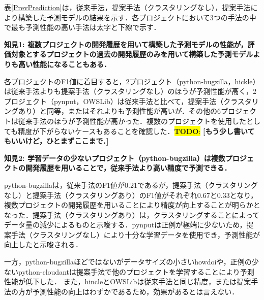 \documentclass[T,J]{fose} %
\newcommand{\todo}[1]{\colorbox{yellow}{{\bf TODO}:}{\color{red} {\textbf{[#1]}}}}
\begin{document}
表\ref{PrevPrediction}は，従来手法，提案手法（クラスタリングなし），提案手法により構築した予測モデルの結果を示す．各プロジェクトにおいて3つの手法の中で最も予測性能の高い手法は太字と下線で示す．

\noindent\textbf{知見1: 複数プロジェクトの開発履歴を用いて構築した予測モデルの性能が，評価対象とするプロジェクトの過去の開発履歴のみを用いて構築した予測モデルよりも高い性能になることもある．}

各プロジェクトのF1値に着目すると，2プロジェクト（python-bugzilla，hickle）は従来手法よりも提案手法（クラスタリングなし）のほうが予測性能が高く，2プロジェクト（pynput，OWSLib）は従来手法と比べて，提案手法（クラスタリングあり）と同等，またはそれよりも予測性能が高いが．その他の6プロジェクトは従来手法のほうが予測性能が高かった．複数のプロジェクトを使用したとしても精度が下がらないケースもあることを確認した．\todo{もう少し書いてもいいけど，ひとまずここまで．}

\noindent\textbf{知見2: 学習データの少ないプロジェクト（python-bugzilla）は複数プロジェクトの開発履歴を用いることで，従来手法より高い精度で予測できる．}

python-bugzillaは，従来手法のF1値が0.21であるが，提案手法（クラスタリングなし）と提案手法（クラスタリングあり）のF1値がそれぞれ0.67と0.33となり，複数プロジェクトの開発履歴を用いることにより精度が向上することが明らかとなった．提案手法（クラスタリングあり）は，クラスタリングすることによってデータ量の減少によるものと示唆する．pynputは正例が極端に少ないため，提案手法（クラスタリングなし）により十分な学習データを使用でき，予測性能が向上したと示唆される．

一方，python-bugzillaほどではないがデータサイズの小さいhowdoiや，正例の少ないpython-cloudantは提案手法で他のプロジェクトを学習することにより予測性能が低下した．
また，hincleとOWSLibは従来手法と同じ精度，または提案手法の方が予測性能の向上はわずかであるため，効果があるとは言えない．




%
%
\end{document}
